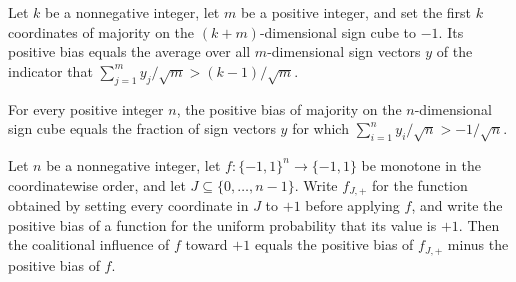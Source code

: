 \begin{theorem}
\label{FABL.positiveBias_bribeFunction_majority_head_neg_one}
\leanok
{}
Let $k$ be a nonnegative integer, let $m$ be a positive integer, and set the first $k$
coordinates of majority on the $(k+m)$-dimensional sign cube to $-1$. Its positive bias
equals the average over all $m$-dimensional sign vectors $y$ of the indicator that
$\sum_{j=1}^m y_j/\sqrt m>(k-1)/\sqrt m$.
\end{theorem}

\begin{theorem}
\label{FABL.positiveBias_majority_eq_hammingUpperTail}
\leanok
{}
For every positive integer $n$, the positive bias of majority on the $n$-dimensional
sign cube equals the fraction of sign vectors $y$ for which $\sum_{i=1}^n y_i/\sqrt
n>-1/\sqrt n$.
\end{theorem}

\begin{theorem}
\label{FABL.coalitionalInfluenceToward_one_eq_positiveBias_change}
\leanok
{}
Let $n$ be a nonnegative integer, let $f:\{-1,1\}^n\to\{-1,1\}$ be monotone in the
coordinatewise order, and let $J\subseteq\{0,\ldots,n-1\}$. Write $f_{J,+}$ for the
function obtained by setting every coordinate in $J$ to $+1$ before applying $f$, and
write the positive bias of a function for the uniform probability that its value is
$+1$. Then the coalitional influence of $f$ toward $+1$ equals the positive bias of
$f_{J,+}$ minus the positive bias of $f$.
\end{theorem}

